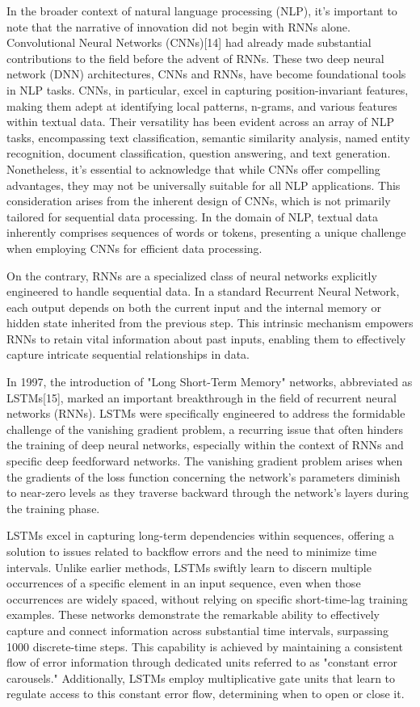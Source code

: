 \documentclass[conference]{IEEEtran}
\begin{document}
In the broader context of natural language processing (NLP), it's important to note that the narrative of innovation did not begin with RNNs alone. Convolutional Neural Networks (CNNs)[14] had already made substantial contributions to the field before the advent of RNNs. These two deep neural network (DNN) architectures, CNNs and RNNs, have become foundational tools in NLP tasks. CNNs, in particular, excel in capturing position-invariant features, making them adept at identifying local patterns, n-grams, and various features within textual data. Their versatility has been evident across an array of NLP tasks, encompassing text classification, semantic similarity analysis, named entity recognition, document classification, question answering, and text generation. Nonetheless, it's essential to acknowledge that while CNNs offer compelling advantages, they may not be universally suitable for all NLP applications. This consideration arises from the inherent design of CNNs, which is not primarily tailored for sequential data processing. In the domain of NLP, textual data inherently comprises sequences of words or tokens, presenting a unique challenge when employing CNNs for efficient data processing.


On the contrary, RNNs are a specialized class of neural networks explicitly engineered to handle sequential data. In a standard Recurrent Neural Network, each output depends on both the current input and the internal memory or hidden state inherited from the previous step. This intrinsic mechanism empowers RNNs to retain vital information about past inputs, enabling them to effectively capture intricate sequential relationships in data. 




In 1997, the introduction of "Long Short-Term Memory" networks, abbreviated as LSTMs[15], marked an important breakthrough in the field of recurrent neural networks (RNNs). LSTMs were specifically engineered to address the formidable challenge of the vanishing gradient problem, a recurring issue that often hinders the training of deep neural networks, especially within the context of RNNs and specific deep feedforward networks. The vanishing gradient problem arises when the gradients of the loss function concerning the network's parameters diminish to near-zero levels as they traverse backward through the network's layers during the training phase.


LSTMs excel in capturing long-term dependencies within sequences, offering a solution to issues related to backflow errors and the need to minimize time intervals. Unlike earlier methods, LSTMs swiftly learn to discern multiple occurrences of a specific element in an input sequence, even when those occurrences are widely spaced, without relying on specific short-time-lag training examples. These networks demonstrate the remarkable ability to effectively capture and connect information across substantial time intervals, surpassing 1000 discrete-time steps. This capability is achieved by maintaining a consistent flow of error information through dedicated units referred to as "constant error carousels." Additionally, LSTMs employ multiplicative gate units that learn to regulate access to this constant error flow, determining when to open or close it.
\end{document}
